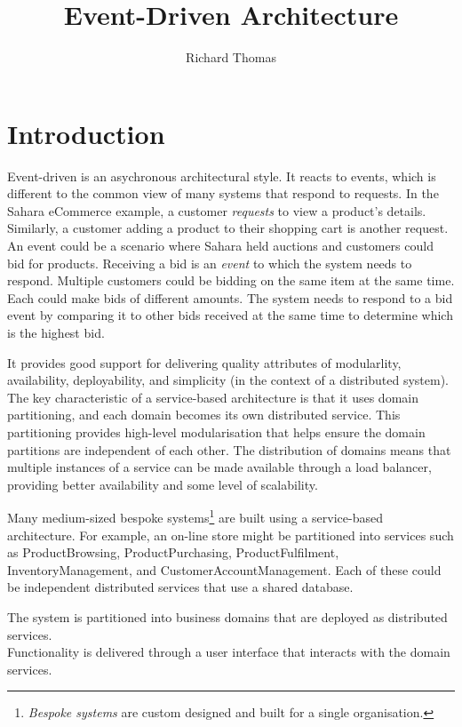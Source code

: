 \title{Event-Driven Architecture}
\author{Richard Thomas}
\date{}

\maketitle

\section{Introduction}

Event-driven is an asychronous architectural style.
It reacts to events, which is different to the common view of many systems that respond to requests.
In the Sahara eCommerce example, a customer \emph{requests} to view a product's details.
Similarly, a customer adding a product to their shopping cart is another request.
An event could be a scenario where Sahara held auctions and customers could bid for products.
Receiving a bid is an \emph{event} to which the system needs to respond.
Multiple customers could be bidding on the same item at the same time.
Each could make bids of different amounts.
The system needs to respond to a bid event by comparing it to other bids received at the same time to determine which is the highest bid.

It provides good support for delivering quality attributes of modularlity, availability, deployability, and simplicity (in the context of a distributed system).
The key characteristic of a service-based architecture is that it uses domain partitioning, and each domain becomes its own distributed service.
This partitioning provides high-level modularisation that helps ensure the domain partitions are independent of each other.
The distribution of domains means that multiple instances of a service can be made available through a load balancer,
providing better availability and some level of scalability.

Many medium-sized bespoke systems\footnote{\emph{Bespoke systems} are custom designed and built for a single organisation.}
are built using a service-based architecture.
For example, an on-line store might be partitioned into services such as ProductBrowsing,
ProductPurchasing, ProductFulfilment, InventoryManagement, and CustomerAccountManagement.
Each of these could be independent distributed services that use a shared database.

\vspace{2mm}
\begin{definition}
    The system is partitioned into business domains that are deployed as distributed services.\\
    Functionality is delivered through a user interface that interacts with the domain services.
\end{definition}

